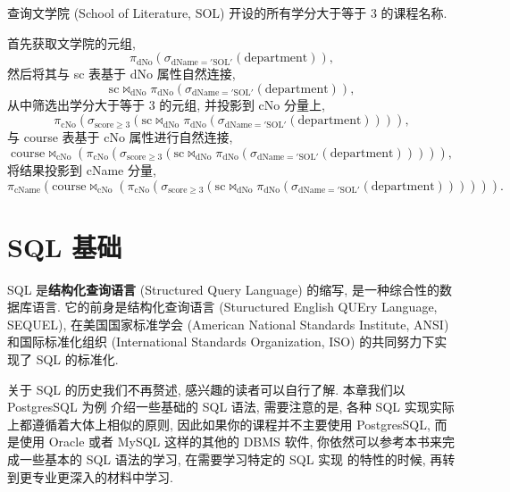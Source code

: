 \documentclass[10pt,UTF8]{book} %
\begin{document}
\begin{example}
    查询文学院 (School of Literature, SOL) 开设的所有学分大于等于 $3$
    的课程名称.
    \begin{sol}
        首先获取文学院的元组,
        \[ \pi_\mathrm{dNo} \left(
            \sigma_\mathrm{dName='SOL'} \left(\mathrm{department}\right)
        \right), \]
        然后将其与 sc 表基于 dNo 属性自然连接,
        \[ \mathrm{sc} \Join_\mathrm{dNo} \pi_\mathrm{dNo} \left(
            \sigma_\mathrm{dName='SOL'} \left(\mathrm{department}\right)
        \right), \]
        从中筛选出学分大于等于 3 的元组,
        并投影到 cNo 分量上,
        \[ \pi_\mathrm{cNo} \left(
            \sigma_\mathrm{score \geqslant 3} \left(
                \mathrm{sc} \Join_\mathrm{dNo} \pi_\mathrm{dNo} \left(
            \sigma_\mathrm{dName='SOL'} \left(\mathrm{department}\right)
        \right)
            \right)
        \right), \]
        与 course 表基于 cNo 属性进行自然连接,
        \[ \mathrm{course} \Join_\mathrm{cNo} \left(
            \pi_\mathrm{cNo} \left(
            \sigma_\mathrm{score \geqslant 3} \left(
                \mathrm{sc} \Join_\mathrm{dNo} \pi_\mathrm{dNo} \left(
            \sigma_\mathrm{dName='SOL'} \left(\mathrm{department}\right)
        \right)
            \right)
        \right)
        \right), \]
        将结果投影到 cName 分量,
        \[ \pi_\mathrm{cName} \left(
            \mathrm{course} \Join_\mathrm{cNo} \left(
            \pi_\mathrm{cNo} \left(
            \sigma_\mathrm{score \geqslant 3} \left(
                \mathrm{sc} \Join_\mathrm{dNo} \pi_\mathrm{dNo} \left(
            \sigma_\mathrm{dName='SOL'} \left(\mathrm{department}\right)
        \right)
            \right)
        \right)
        \right)
        \right). \]
    \end{sol}
\end{example}

\newpage
\thispagestyle{empty}

\chapter{SQL 基础}

SQL 是\textbf{结构化查询语言} (Structured Query Language) 的缩写,
是一种综合性的数据库语言.
它的前身是结构化查询语言 (Stuructured English QUEry Language, SEQUEL),
在美国国家标准学会 (American National Standards Institute, ANSI) 和国际标准化组织
(International Standards Organization, ISO) 的共同努力下实现了 SQL 的标准化.

关于 SQL 的历史我们不再赘述, 感兴趣的读者可以自行了解. 本章我们以 PostgresSQL 为例
介绍一些基础的 SQL 语法, 需要注意的是, 各种 SQL 实现实际上都遵循着大体上相似的原则,
因此如果你的课程并不主要使用 PostgresSQL, 而是使用 Oracle 或者 MySQL 这样的其他的
DBMS 软件, 你依然可以参考本书来完成一些基本的 SQL 语法的学习, 在需要学习特定的 SQL 实现
的特性的时候, 再转到更专业更深入的材料中学习.
\end{document}
